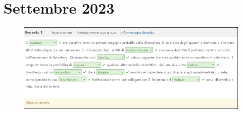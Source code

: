 \chapter{Settembre 2023}

\begin{figure}
    \centering
    \includegraphics[scale = 0.5]{images/Settembre2023-1.png}
\end{figure}